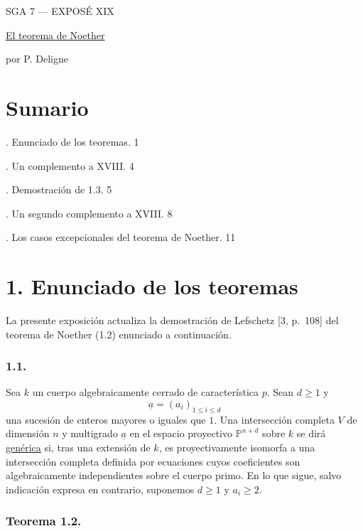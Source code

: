 \pageoriginale

\clearpage
{}
\begin{center}
{\large SGA 7 --- EXPOSÉ XIX}\par
\vspace{2em}
{\Large\underline{El teorema de Noether}}\par
\vspace{1.5em}
{\large por P. Deligne}
\end{center}

\section*{Sumario}

. Enunciado de los teoremas. \hfill 1

. Un complemento a XVIII. \hfill 4

. Demostración de 1.3. \hfill 5

. Un segundo complemento a XVIII. \hfill 8

. Los casos excepcionales del teorema de Noether. \hfill 11

\section*{1. Enunciado de los teoremas}

La presente exposición actualiza la demostración de Lefschetz
[3, p.~108] del teorema de Noether (1.2) enunciado a continuación.

\subsubsection*{1.1.}

Sea $k$ un cuerpo algebraicamente cerrado de característica $p$. Sean
$d\geq1$ y
\[
\underline a=(a_i)_{1\leq i\leq d}
\]
una sucesión de enteros mayores o iguales que $1$. Una intersección
completa $V$ de dimensión $n$ y multigrado $\underline a$ en el espacio
proyectivo $\mathbb P^{n+d}$ sobre $k$ se dirá \underline{genérica} si,
tras una extensión de $k$, es proyectivamente isomorfa a una
intersección completa definida por ecuaciones cuyos coeficientes son
algebraicamente independientes sobre el cuerpo primo. En lo que sigue,
salvo indicación expresa en contrario, suponemos $d\geq1$ y $a_i\geq2$.

\subsubsection*{Teorema 1.2.}

